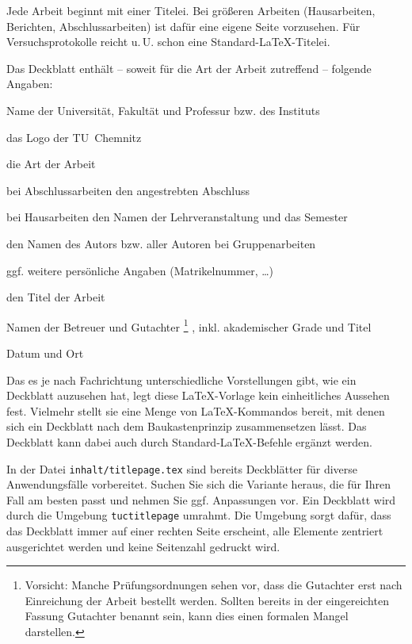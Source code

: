 Jede Arbeit beginnt mit einer Titelei. Bei größeren Arbeiten
(Hausarbeiten, Berichten, Abschlussarbeiten) ist dafür eine eigene Seite
vorzusehen. Für Versuchsprotokolle reicht u.\,U. schon eine
Standard-\LaTeX-Titelei.

Das Deckblatt enthält -- soweit für die Art der Arbeit zutreffend --
folgende Angaben:

\begin{compactitem}
\item Name der Universität, Fakultät und Professur bzw. des Instituts
\item das Logo der TU~Chemnitz
\item die Art der Arbeit
\item bei Abschlussarbeiten den angestrebten Abschluss
\item bei Hausarbeiten den Namen der Lehrveranstaltung und das Semester
\item den Namen des Autors bzw. aller Autoren bei Gruppenarbeiten
\item ggf. weitere persönliche Angaben (Matrikelnummer, \dots)
\item den Titel der Arbeit
\item Namen der Betreuer und Gutachter%
      \footnote{Vorsicht: Manche Prüfungsordnungen sehen vor, dass die
                Gutachter erst nach Einreichung der Arbeit bestellt werden.
		Sollten bereits in der eingereichten Fassung Gutachter benannt
		sein, kann dies einen formalen Mangel darstellen.}%
      , inkl. akademischer Grade und Titel
\item Datum und Ort
\end{compactitem}

Das es je nach Fachrichtung unterschiedliche Vorstellungen gibt, wie ein
Deckblatt auzusehen hat, legt diese \LaTeX-Vorlage kein einheitliches Aussehen
fest. Vielmehr stellt sie eine Menge von \LaTeX-Kommandos bereit, mit denen
sich ein Deckblatt nach dem Baukastenprinzip zusammensetzen lässt. Das
Deckblatt kann dabei auch durch Standard-\LaTeX-Befehle ergänzt werden.

In der Datei \texttt{inhalt/titlepage.tex} sind bereits Deckblätter für diverse
Anwendungsfälle vorbereitet. Suchen Sie sich die Variante heraus, die
für Ihren Fall am besten passt und nehmen Sie ggf. Anpassungen vor. Ein
Deckblatt wird durch die Umgebung \texttt{tuctitlepage} umrahmt. Die Umgebung
sorgt dafür, dass das Deckblatt immer auf einer rechten Seite erscheint, alle
Elemente zentriert ausgerichtet werden und keine Seitenzahl gedruckt wird.

